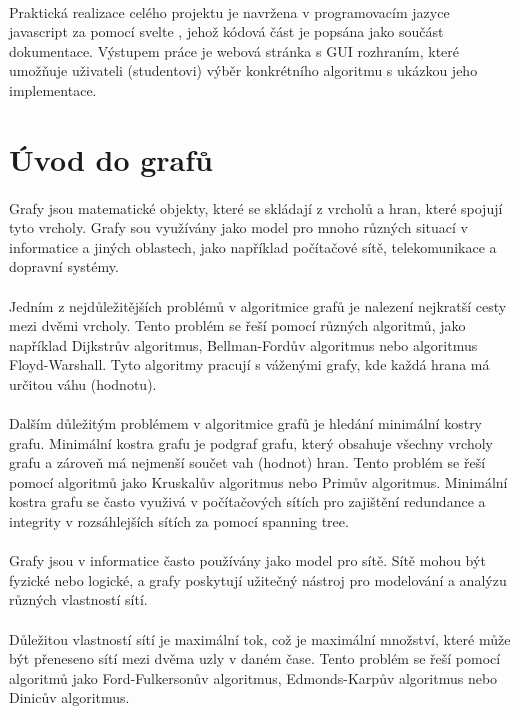 \documentclass[12pt, titlepage, a4paper]{article}
\begin{document}
\paragraph{}
Praktická realizace celého projektu je navržena v programovacím jazyce javascript za pomocí svelte
, jehož kódová část je popsána jako součást dokumentace. Výstupem práce je webová stránka
s GUI rozhraním, které umožňuje uživateli (studentovi) výběr konkrétního algoritmu s ukázkou jeho implementace.
\newpage
\section{Úvod do grafů}
\paragraph{}
Grafy jsou matematické objekty, které se skládají z vrcholů a hran, které spojují tyto
vrcholy. Grafy sou využívány jako model pro mnoho různých situací v informatice a jiných
oblastech, jako například počítačové sítě, telekomunikace a dopravní systémy.
\paragraph{}
Jedním z nejdůležitějších problémů v algoritmice grafů je nalezení nejkratší cesty mezi
dvěmi vrcholy. Tento problém se řeší pomocí různých algoritmů, jako například Dijkstrův
algoritmus, Bellman-Fordův algoritmus nebo algoritmus Floyd-Warshall. Tyto algoritmy
pracují s váženými grafy, kde každá hrana má určitou váhu (hodnotu).
\paragraph{}
Dalším důležitým problémem v algoritmice grafů je hledání minimální kostry grafu. Minimální
kostra grafu je podgraf grafu, který obsahuje všechny vrcholy grafu a zároveň má nejmenší
součet vah (hodnot) hran. Tento problém se řeší pomocí algoritmů jako Kruskalův algoritmus nebo Primův
algoritmus. Minimální kostra grafu se často využivá v počítačových sítích pro zajištění redundance
a integrity v rozsáhlejších sítích za pomocí spanning tree.
\paragraph{}
Grafy jsou v informatice často používány jako model pro sítě. Sítě mohou být fyzické nebo
logické, a grafy poskytují užitečný nástroj pro modelování a analýzu různých vlastností sítí.
\paragraph{}
Důležitou vlastností sítí je maximální tok, což je maximální množství, které může být přeneseno
sítí mezi dvěma uzly v daném čase. Tento problém se řeší pomocí algoritmů jako Ford-Fulkersonův
algoritmus, Edmonds-Karpův algoritmus nebo Dinicův algoritmus.
\newpage
\end{document}
